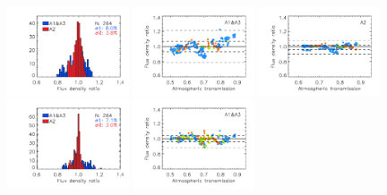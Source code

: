 \begin{figure}[ht!]
\begin{center}
    \includegraphics[clip=true, trim={0.9cm, 0.2cm, 0, 0.6cm}, width=0.32\textwidth]{Figures/Calibration/plot_histo_flux_density_ratio_obstau_allbright_tau225_narrow_1n2mm.pdf}
    \includegraphics[clip=true, trim={0.9cm, 0.2cm, 0, 0.6cm}, width=0.32\textwidth]{Figures/Calibration/plot_flux_density_ratio_obstau_allbright_skydip_narrow_1mm.pdf}
    \includegraphics[clip=true, trim={0.9cm, 0.2cm, 0, 0.6cm}, width=0.32\textwidth]{Figures/Calibration/plot_flux_density_ratio_obstau_allbright_skydip_narrow_a2.pdf}
    \includegraphics[clip=true, trim={0.9cm, 0.2cm, 0, 0.6cm}, width=0.32\textwidth]{Figures/Calibration/plot_histo_flux_density_ratio_obstau_allbright_skydip_narrow_1n2mm.pdf}
    \includegraphics[clip=true, trim={0.9cm, 0.2cm, 0, 0.6cm}, width=0.32\textwidth]{Figures/Calibration/plot_flux_density_ratio_obstau_allbright_corrected_skydip_photocorr_demo_narrow_1mm.pdf}

\end{center}
\end{figure}

